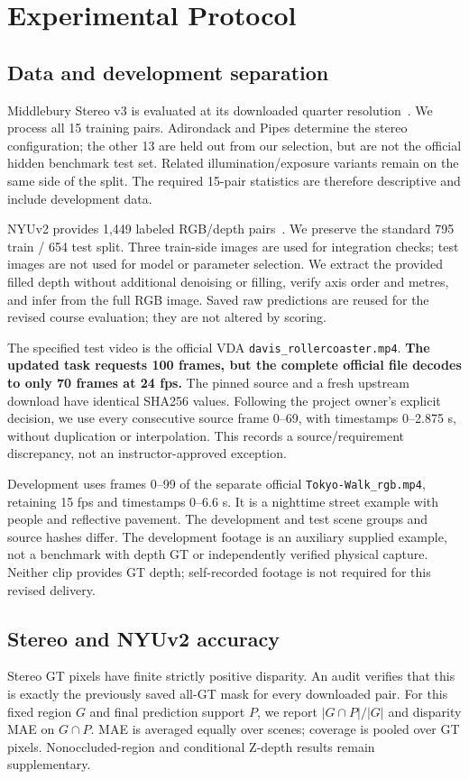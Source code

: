 \section{Experimental Protocol}
\subsection{Data and development separation}
Middlebury Stereo v3 is evaluated at its downloaded quarter resolution~\cite{middlebury}. We process all 15 training pairs. Adirondack and Pipes determine the stereo configuration; the other 13 are held out from our selection, but are not the official hidden benchmark test set. Related illumination/exposure variants remain on the same side of the split. The required 15-pair statistics are therefore descriptive and include development data.

NYUv2 provides 1,449 labeled RGB/depth pairs~\cite{nyu}. We preserve the standard 795 train / 654 test split. Three train-side images are used for integration checks; test images are not used for model or parameter selection. We extract the provided filled depth without additional denoising or filling, verify axis order and metres, and infer from the full RGB image. Saved raw predictions are reused for the revised course evaluation; they are not altered by scoring.

The specified test video is the official VDA \texttt{davis\_rollercoaster.mp4}. \textbf{The updated task requests 100 frames, but the complete official file decodes to only 70 frames at 24 fps.} The pinned source and a fresh upstream download have identical SHA256 values. Following the project owner's explicit decision, we use every consecutive source frame 0--69, with timestamps 0--2.875 s, without duplication or interpolation. This records a source/requirement discrepancy, not an instructor-approved exception.

Development uses frames 0--99 of the separate official \texttt{Tokyo-Walk\_rgb.mp4}, retaining 15 fps and timestamps 0--6.6 s. It is a nighttime street example with people and reflective pavement. The development and test scene groups and source hashes differ. The development footage is an auxiliary supplied example, not a benchmark with depth GT or independently verified physical capture. Neither clip provides GT depth; self-recorded footage is not required for this revised delivery.

\subsection{Stereo and NYUv2 accuracy}
Stereo GT pixels have finite strictly positive disparity. An audit verifies that this is exactly the previously saved all-GT mask for every downloaded pair. For this fixed region $G$ and final prediction support $P$, we report $|G\cap P|/|G|$ and disparity MAE on $G\cap P$. MAE is averaged equally over scenes; coverage is pooled over GT pixels. Nonoccluded-region and conditional Z-depth results remain supplementary.

